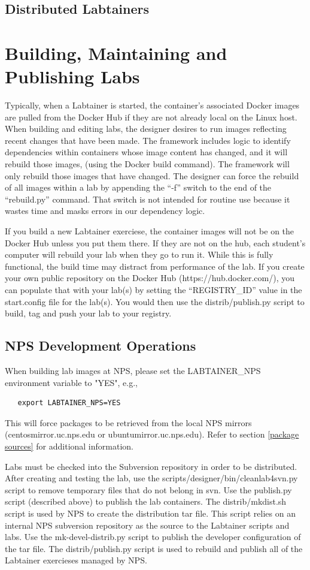 \documentclass[12pt]{article}
\begin{document}
\subsection{Distributed Labtainers}


\section{Building, Maintaining and Publishing Labs} \label{publishing}
Typically, when a Labtainer is started, the container's associated Docker images are pulled from
the Docker Hub if they are not already local on the Linux host.  When building and editing labs,
the designer desires to run images reflecting recent changes that have been made.  The framework
includes logic to identify dependencies within containers whose image content has changed, 
and it will rebuild those images, (using the Docker build command).  The framework will only 
rebuild those images that have changed.  The designer can force the rebuild of all images within
a lab by appending the ``-f'' switch to the end of the ``rebuild.py'' command.  That switch is not
intended for routine use because it wastes time and masks errors in our dependency logic.

If you build a new Labtainer exerciese, the container images will not be on the Docker Hub unless you put
them there.  If they are not on the hub, each student's computer will rebuild your lab when they go to run it.
While this is fully functional, the build time may distract from performance of the lab.  If you
create your own public repository on the Docker Hub (https://hub.docker.com/), you can populate that
with your lab(s) by setting the ``REGISTRY\_ID'' value in the start.config file for the lab(s). You
would then use the distrib/publish.py script to build, tag and push your lab to your registry.

\subsection{NPS Development Operations}
When building lab images at NPS, please set the LABTAINER\_NPS environment variable to "YES", e.g.,
\begin{verbatim}
   export LABTAINER_NPS=YES
\end{verbatim}
This will force packages to be retrieved from the local NPS mirrors (centosmirror.uc.nps.edu or
ubuntumirror.uc.nps.edu).  Refer to section \ref{package sources} for additional information.

Labs must be checked into the Subversion repository in order to be distributed.  After creating and testing
the lab, use the scripts/designer/bin/cleanlab4svn.py script to remove temporary files that do not belong in 
svn.  Use the publish.py script (described above) to publish the lab containers.
The distrib/mkdist.sh script is used by NPS to create the distribution tar file.  This script relies on
an internal NPS subversion repository as the source to the Labtainer scripts and labs.  Use the mk-devel-distrib.py script
to publish the developer configuration of the tar file.  The distrib/publish.py script is used to rebuild and 
publish all of the Labtainer exercieses managed by NPS.
\end{document}

